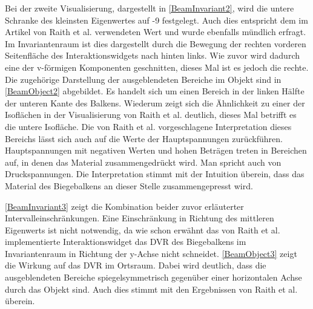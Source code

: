 \documentclass[a4paper,fontsize=12pt,toc=bib,parskip=half,ngerman]{scrartcl}
\begin{document}
Bei der zweite Visualisierung, dargestellt in \cref{BeamInvariant2}, wird die untere Schranke des kleinsten Eigenwertes auf -9 festgelegt. Auch dies entspricht dem im Artikel von Raith et al. verwendeten Wert und wurde ebenfalls m\"undlich erfragt. Im Invariantenraum ist dies dargestellt durch die Bewegung der rechten vorderen Seitenfl\"ache des Interaktionswidgets nach hinten links. Wie zuvor wird dadurch eine der v-f\"ormigen Komponenten geschnitten, dieses Mal ist es jedoch die rechte. Die zugeh\"orige Darstellung der ausgeblendeten Bereiche im Objekt sind in \cref{BeamObject2} abgebildet. Es handelt sich um einen Bereich in der linken H\"alfte der unteren Kante des Balkens. Wiederum zeigt sich die \"Ahnlichkeit zu einer der Isofl\"achen in der Visualisierung von Raith et al. deutlich, dieses Mal betrifft es die untere Isofl\"ache. Die von Raith et al. vorgeschlagene Interpretation dieses Bereichs l\"asst sich auch auf die Werte der Hauptspannungen zur\"uckf\"uhren. Hauptspannungen mit negativen Werten und hohen Betr\"agen treten in Bereichen auf, in denen das Material zusammengedr\"uckt wird. Man spricht auch von Druckspannungen. Die Interpretation stimmt mit der Intuition \"uberein, dass das Material des Biegebalkens an dieser Stelle zusammengepresst wird.

\cref{BeamInvariant3} zeigt die Kombination beider zuvor erl\"auterter Intervalleinschr\"ankungen. Eine Einschr\"ankung in Richtung des mittleren Eigenwerts ist nicht notwendig, da wie schon erw\"ahnt das von Raith et al. implementierte Interaktionswidget das DVR des Biegebalkens im Invariantenraum in Richtung der y-Achse nicht schneidet. \cref{BeamObject3} zeigt die Wirkung auf das DVR im Ortsraum. Dabei wird deutlich, dass die ausgeblendeten Bereiche spiegelsymmetrisch gegen\"uber einer horizontalen Achse durch das Objekt sind. Auch dies stimmt mit den Ergebnissen von Raith et al. \"uberein.
\end{document}
